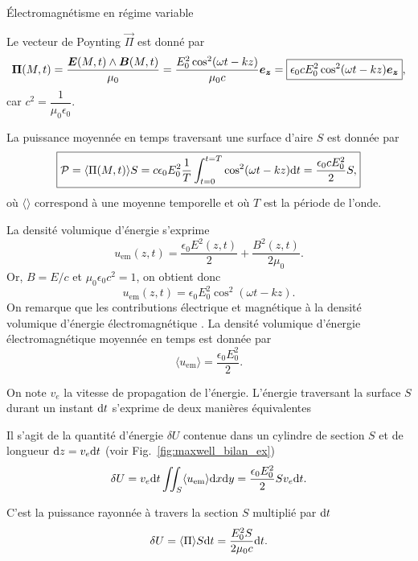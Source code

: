 \begin{corr}{Électromagnétisme en régime variable}
\begin{corrlist}
     \item Le vecteur de Poynting $\vec{\Pi}$ est donné par
	  \begin{equation*}
		  \vec{\Pi}(M, t) = \dfrac{\vece(M, t) \wedge \vecb(M, t)}{\mu_0}
		  = \dfrac{E_0^2 \cos^2(\omega t - k z)}{\mu_0 c} \ez
		  = \boxed{\epsilon_0 c E_0^2 \cos^2(\omega t - kz) \ez},
	  \end{equation*}
	  car $c^2 = \dfrac{1}{\mu_0 \epsilon_0}$.
     \item La puissance moyennée en temps traversant une surface d’aire $S$ est
	   donnée par
	   \begin{equation*}
		   \boxed{
			   \mathcal{P} = \langle \Pi(M,t) \rangle S = 
		   c \epsilon_0 E_0^2
		   \dfrac{1}{T} \int_{t = 0}^{t = T} \cos^2(\omega t - kz) \mathrm{d}t
		   = \dfrac{\epsilon_0 c E_0^2}{2}S,
	   }
	   \end{equation*}
	   où $\langle \rangle$ correspond à une moyenne temporelle et où $T$ 
	   est la période de l'onde.

     \item La densité volumique d'énergie s'exprime
	   \begin{equation*}
		   u_\mathrm{em}(z, t) = \dfrac{\epsilon_0 E^2(z, t)}{2} + 
		   \dfrac{B^2(z, t)}{2 \mu_0}.
	   \end{equation*}
	   Or, $B = E/c$ et $\mu_0 \epsilon_0 c^2 = 1$, on obtient donc
	   \begin{equation*}
		   \boxed{
			   u_\mathrm{em}(z, t) = \epsilon_0 E_0^2 \cos^2(\omega t - kz)
	   }.
   	\end{equation*}
	On remarque que les contributions électrique et magnétique à la densité 
	volumique d'énergie électromagnétique . La densité
	volumique d'énergie électromagnétique moyennée en temps est donnée par
	\begin{equation*}
		\boxed{
		\langle u_\mathrm{em} \rangle = \dfrac{\epsilon_0 E_0^2}{2}
		.}
	\end{equation*}
	\item On note $v_e$ la vitesse de propagation de l'énergie. L'énergie 
	      traversant la surface $S$ durant un instant $\mathrm{d}t$ s'exprime de deux
	      manières équivalentes
	      \begin{corrlist}
		      \item Il s'agit de la quantité d'énergie $\delta U$ contenue dans 
			    un cylindre de section $S$ et de longueur 
			    $\mathrm{d}z = v_e \mathrm{d}t$ (voir Fig.~\ref{fig:maxwell_bilan_ex})
			    \begin{equation*}
				    \delta U = v_e \mathrm{d}t \iint_S \langle
				    u_\mathrm{em} \rangle \mathrm{d}x \mathrm{d}y =
				    \dfrac{\epsilon_0 E_0^2}{2} S v_e \mathrm{d}t.
			   \end{equation*}
		     \item C'est la puissance rayonnée à travers la section $S$
			   multiplié par $\mathrm{d}t$
			   \begin{equation*}
				   \delta U = \langle \Pi \rangle S \mathrm{d}t = 
				   \dfrac{E_0^2 S}{2 \mu_0 c} \mathrm{d}t.
			  \end{equation*}


\end{corrlist}
\end{corrlist}
\end{corr}
